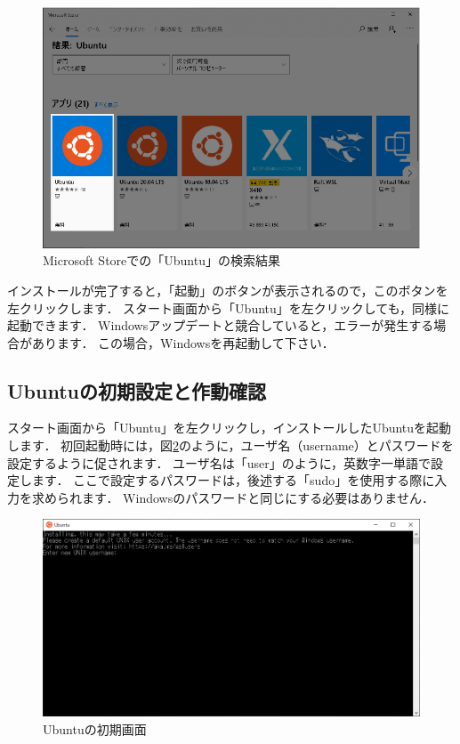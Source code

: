 \documentclass[dvipdfmx]{jarticle}
\begin{document}
\begin{figure}[h]
  \centering
  \includegraphics[width=0.95\linewidth]{figures/Store.eps}
  \caption{Microsoft Storeでの「Ubuntu」の検索結果}
  \label{fig:store}
\end{figure}

インストールが完了すると，「起動」のボタンが表示されるので，このボタンを左クリックします．
スタート画面から「Ubuntu」を左クリックしても，同様に起動できます．
Windowsアップデートと競合していると，エラーが発生する場合があります．
この場合，Windowsを再起動して下さい．

\subsection{Ubuntuの初期設定と作動確認}

スタート画面から「Ubuntu」を左クリックし，インストールしたUbuntuを起動します．
初回起動時には，図\ref{fig:Ubuntu}のように，ユーザ名（username）とパスワードを設定するように促されます．
ユーザ名は「user」のように，英数字一単語で設定します．
ここで設定するパスワードは，後述する「sudo」を使用する際に入力を求められます．
Windowsのパスワードと同じにする必要はありません．

\begin{figure}[h]
  \centering
  \includegraphics[width=0.95\linewidth]{figures/UbuntuDefault.png}
  \caption{Ubuntuの初期画面}
  \label{fig:Ubuntu}
\end{figure}
\end{document}
